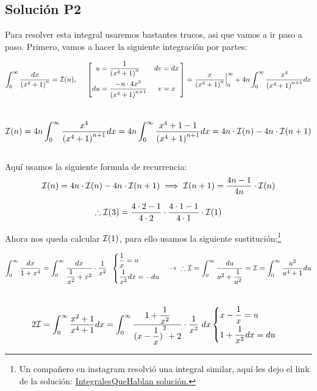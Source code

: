 \begin{CajaTitulo}{\begin{center}\subsection{Solución P2}\end{center}}
    \vspace{1cm}
    Para resolver esta integral usaremos bastantes trucos, asi que vamos a ir paso a paso. Primero, vamos a hacer la siguiente integración por partes:

    \[\int_{0}^{\infty}\frac{dx}{ {(x^4 +1)}^n} = \I(n), \hspace{0.5cm}\PorPartes{\frac{1}{{(x^4 +1)}^n}}{\frac{-n\cdot 4x^3}{{(x^4 +1)}^{n+1}}}{dx}{x} = \frac{x}{{(x^4 +1)}^n} 
    \Brackets_{0}^{\infty} + 4n\int_{0}^{\infty}\frac{x^4}{{(x^4 +1)}^{n+1}}dx\]
    \\


    \[\I(n) = 4n\int_{0}^{\infty}\frac{x^4}{{(x^4 +1)}^{n+1}}dx = 4n\int_{0}^{\infty}\frac{x^4 + 1 - 1}{{(x^4 +1)}^{n+1}}dx = 4n\cdot \I(n) - 4n \cdot\I(n+1)\] 
    \\
Aquí usamos la siguiente formula de recurrencia: 
    \[\I(n) = 4n \cdot \I(n) - 4n \cdot \I(n+1) \implies \I(n+1) =  \frac{4n-1}{4n}\cdot\I(n)\]

    \[\therefore \I(3) = \frac{4\cdot 2 - 1}{4\cdot2} \cdot \frac{4\cdot1 - 1}{4\cdot1}\cdot\I(1)\]

    Ahora nos queda calcular $\I(1)$, para ello usamos la siguiente sustitución:\footnote{Un compañero en instagram resolvió una integral similar, aquí les dejo el link de la solución: \href{https://www.instagram.com/p/Cr7I89yg4Ww/?img_index=2}{IntegralesQueHablan solución.} }

    \[\int_{0}^{\infty}\frac{dx}{1 + x^4} = \int_{0}^{\infty}\frac{dx}{\mathlarger{\frac{1}{x^2}} + x^2}\cdot\frac{1}{x^2} \hspace*{0.2cm}\cambio{\mathlarger{\frac{1}{x}} = u \vspace{0.1cm}}{\mathlarger{\frac{1}{x^2}}dx = -du} \rightarrow  \hspace{0.2cm}\Porlo\I = \int_{0}^{\infty}\frac{du}{u^2 + \mathlarger{\frac{1}{u^2}}} = \I = \int_{0}^{\infty}\frac{u^2}{u^4 + 1 }du \]
    \\


    \[ 2\I = \int_{0}^{\infty}\frac{x^2 + 1}{x^4 +1}dx = \int_{0}^{\infty}\frac{1 + \mathlarger{\frac{1}{x^2}}}{ {(x - \mathlarger{\frac{1}{x}})}^2 + 2 }\cdot\frac{1}{x^2}\hspace{0.1cm} dx \cambio{x - \mathlarger{\frac{1}{x}} = u \vspace{0.13cm}}{1 + \mathlarger{\frac{1}{x^2}}dx = du}\]


\end{CajaTitulo}

